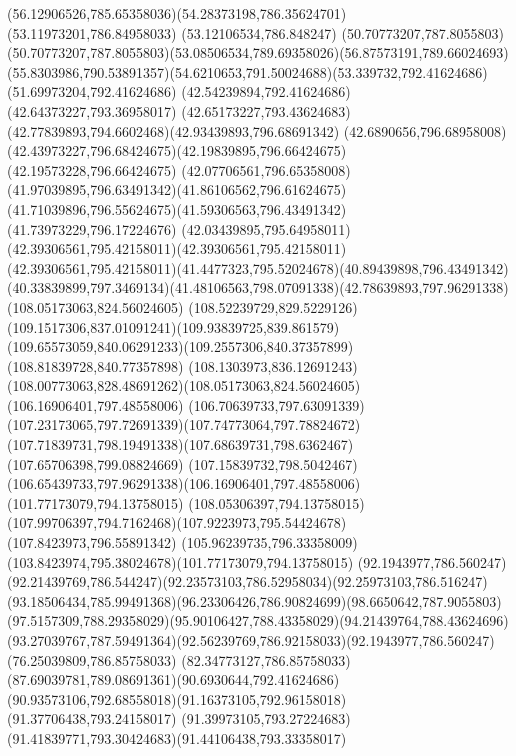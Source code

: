{{	\curveto(56.12906526,785.65358036)(54.28373198,786.35624701)(53.11973201,786.84958033)
	\lineto(53.12106534,786.848247)
	\lineto(50.70773207,787.8055803)
	\curveto(50.70773207,787.8055803)(53.08506534,789.69358026)(56.87573191,789.66024693)
	\curveto(55.8303986,790.53891357)(54.6210653,791.50024688)(53.339732,792.41624686)
	\lineto(51.69973204,792.41624686)
	\lineto(42.54239894,792.41624686)
	\lineto(42.64373227,793.36958017)
	\curveto(42.65173227,793.43624683)(42.77839893,794.6602468)(42.93439893,796.68691342)
	\curveto(42.6890656,796.68958008)(42.43973227,796.68424675)(42.19839895,796.66424675)
	\lineto(42.19573228,796.66424675)
	\curveto(42.07706561,796.65358008)(41.97039895,796.63491342)(41.86106562,796.61624675)
	\curveto(41.71039896,796.55624675)(41.59306563,796.43491342)(41.73973229,796.17224676)
	\curveto(42.03439895,795.64958011)(42.39306561,795.42158011)(42.39306561,795.42158011)
	\curveto(42.39306561,795.42158011)(41.4477323,795.52024678)(40.89439898,796.43491342)
	\curveto(40.33839899,797.3469134)(41.48106563,798.07091338)(42.78639893,797.96291338)
	\moveto(108.05173063,824.56024605)
	\curveto(108.52239729,829.5229126)(109.1517306,837.01091241)(109.93839725,839.861579)
	\curveto(109.65573059,840.06291233)(109.2557306,840.37357899)(108.81839728,840.77357898)
	\curveto(108.1303973,836.12691243)(108.00773063,828.48691262)(108.05173063,824.56024605)
	\moveto(106.16906401,797.48558006)
	\curveto(106.70639733,797.63091339)(107.23173065,797.72691339)(107.74773064,797.78824672)
	\curveto(107.71839731,798.19491338)(107.68639731,798.6362467)(107.65706398,799.08824669)
	\curveto(107.15839732,798.5042467)(106.65439733,797.96291338)(106.16906401,797.48558006)
	\moveto(101.77173079,794.13758015)
	\lineto(108.05306397,794.13758015)
	\curveto(107.99706397,794.7162468)(107.9223973,795.54424678)(107.8423973,796.55891342)
	\curveto(105.96239735,796.33358009)(103.8423974,795.38024678)(101.77173079,794.13758015)
	\moveto(92.1943977,786.560247)
	\curveto(92.21439769,786.544247)(92.23573103,786.52958034)(92.25973103,786.516247)
	\curveto(93.18506434,785.99491368)(96.23306426,786.90824699)(98.6650642,787.9055803)
	\curveto(97.5157309,788.29358029)(95.90106427,788.43358029)(94.21439764,788.43624696)
	\curveto(93.27039767,787.59491364)(92.56239769,786.92158033)(92.1943977,786.560247)
	\moveto(76.25039809,786.85758033)
	\curveto(82.34773127,786.85758033)(87.69039781,789.08691361)(90.6930644,792.41624686)
	\curveto(90.93573106,792.68558018)(91.16373105,792.96158018)(91.37706438,793.24158017)
	\curveto(91.39973105,793.27224683)(91.41839771,793.30424683)(91.44106438,793.33358017)
}}
